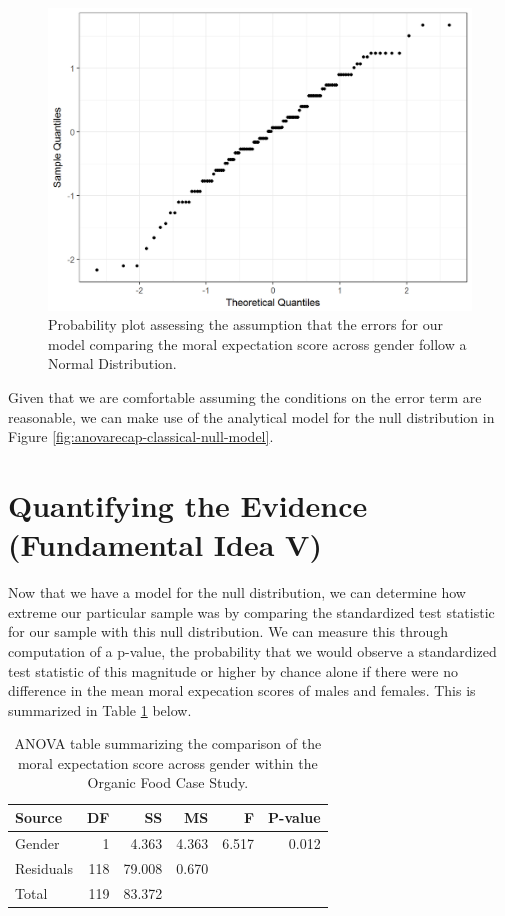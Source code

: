 \documentclass[]{book}
\theoremstyle{definition}
\theoremstyle{definition}
\theoremstyle{remark}
\begin{document}
\begin{figure}

{\centering \includegraphics[width=0.8\linewidth]{./Images/anovarecap-resids-probplot-1} 

}

\caption{Probability plot assessing the assumption that the errors for our model comparing the moral expectation score across gender follow a Normal Distribution.}\label{fig:anovarecap-resids-probplot}
\end{figure}

Given that we are comfortable assuming the conditions on the error term
are reasonable, we can make use of the analytical model for the null
distribution in Figure \ref{fig:anovarecap-classical-null-model}.

\section{Quantifying the Evidence (Fundamental Idea
V)}\label{quantifying-the-evidence-fundamental-idea-v-1}

Now that we have a model for the null distribution, we can determine how
extreme our particular sample was by comparing the standardized test
statistic for our sample with this null distribution. We can measure
this through computation of a p-value, the probability that we would
observe a standardized test statistic of this magnitude or higher by
chance alone if there were no difference in the mean moral expecation
scores of males and females. This is summarized in Table
\ref{tab:anovarecap-anova-table} below.

\begin{table}

\caption{\label{tab:anovarecap-anova-table}ANOVA table summarizing the comparison of the moral expectation score across gender within the Organic Food Case Study.}
\centering
\begin{tabular}[t]{l|r|r|r|r|r}
\hline
Source & DF & SS & MS & F & P-value\\
\hline
Gender & 1 & 4.363 & 4.363 & 6.517 & 0.012\\
\hline
Residuals & 118 & 79.008 & 0.670 &  & \\
\hline
Total & 119 & 83.372 &  &  & \\
\hline
\end{tabular}
\end{table}
\end{document}
